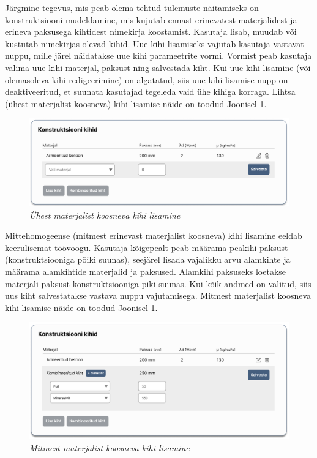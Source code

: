 Järgmine tegevus, mis peab olema tehtud tulemuste näitamiseks on konstruktsiooni mudeldamine, mis
kujutab ennast erinevatest materjalidest ja erineva paksusega kihtidest nimekirja koostamist.
Kasutaja lisab, muudab või kustutab nimekirjas olevad kihid. Uue kihi lisamiseks vajutab kasutaja
vastavat nuppu, mille järel näidatakse uue kihi parameetrite vormi. Vormist peab kasutaja
valima uue kihi materjal, paksust ning salvestada kiht. Kui uue kihi lisamine (või
olemasoleva kihi redigeerimine) on algatatud, siis uue kihi lisamise nupp on deaktiveeritud, et
suunata kasutajad tegeleda vaid ühe kihiga korraga. Lihtsa (ühest materjalist koosneva) kihi lisamise näide
on toodud Joonisel \ref{fig:design_simple_layer}.
\begin{figure}[ht]
    \centering
    \includegraphics[width=1\textwidth]{figures/analysis/desing_calc_simple_layer.png}
    \caption[Ühest materjalist koosneva kihi lisamine]{\textit{Ühest materjalist koosneva kihi lisamine}}
    \label{fig:design_simple_layer}
\end{figure}

Mittehomogeense (mitmest erinevast materjalist koosneva) kihi lisamine eeldab keerulisemat töövoogu.
Kasutaja kõigepealt peab määrama peakihi paksust (konstruktsiooniga põiki suunas), seejärel lisada 
vajalikku arvu alamkihte ja määrama alamkihtide materjalid ja paksused. Alamkihi paksuseks loetakse 
materjali paksust konstruktsiooniga piki suunas. Kui kõik andmed on valitud, siis uus kiht salvestatakse
vastava nuppu vajutamisega. Mitmest materjalist koosneva kihi lisamise näide on toodud Joonisel \ref{fig:design_simple_layer}.
\begin{figure}[ht]
    \centering
    \includegraphics[width=1\textwidth]{figures/analysis/desing_calc_multi_layer.png}
    \caption[Mitmest materjalist koosneva kihi lisamine]{\textit{Mitmest materjalist koosneva kihi lisamine}}
    \label{fig:design_multy_layer}
\end{figure}

